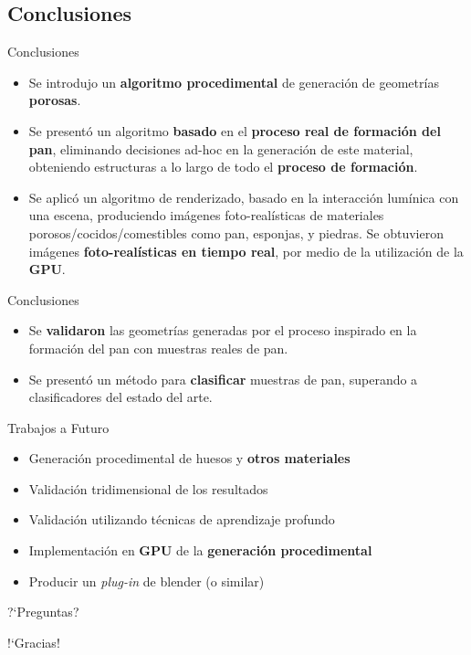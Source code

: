 \documentclass[spanish,unknownkeysallowed,10pt]{beamer}
\begin{document}
\subsection{Conclusiones}
\begin{frame}{Conclusiones}
\begin{block}{}
\begin{itemize}
\item Se introdujo un \textbf{algoritmo procedimental} de generación de geometrías \textbf{porosas}.
\item Se presentó un algoritmo \textbf{basado} en el \textbf{proceso real de formación del pan}, eliminando decisiones ad-hoc en la generación de este material, obteniendo estructuras a lo largo de todo el \textbf{proceso de formación}.
\item Se aplicó un algoritmo de renderizado, basado en la interacción lumínica con una escena, produciendo imágenes foto-realísticas de materiales porosos/cocidos/comestibles como pan, esponjas, y piedras. Se obtuvieron imágenes \textbf{foto-realísticas en tiempo real}, por medio de la utilización de la \textbf{GPU}.
\end{itemize}
\end{block}
\end{frame}

\begin{frame}{Conclusiones}
\begin{block}{}
\begin{itemize}
\item Se \textbf{validaron} las geometrías generadas por el proceso inspirado en la formación del pan con muestras reales de pan.
\item Se presentó un método para \textbf{clasificar} muestras de pan, superando a clasificadores del estado del arte.
\end{itemize}
\end{block}


\begin{block}{Trabajos a Futuro}
\begin{itemize}
\item Generación procedimental de huesos y \textbf{otros materiales}
\item Validación tridimensional de los resultados
\item Validación utilizando técnicas de aprendizaje profundo
\item Implementación en \textbf{GPU} de la \textbf{generación procedimental}
\item Producir un {\it plug-in} de blender (o similar)
\end{itemize}
\end{block}
\end{frame}

\begin{frame}
\centering

?`Preguntas?

\end{frame}

\begin{frame}
\centering

!`Gracias!

\end{frame}
\end{document}
